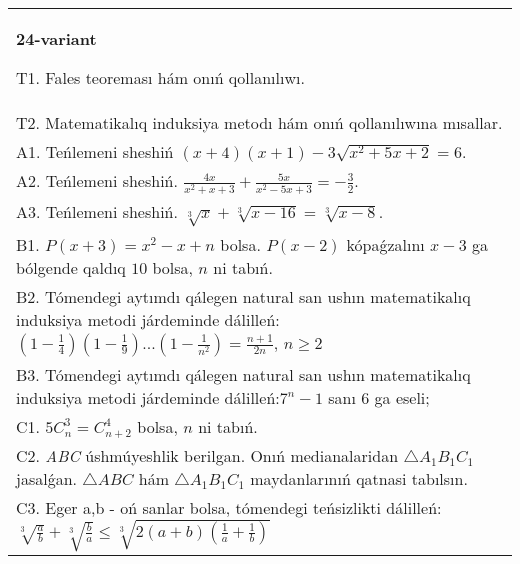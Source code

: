 \documentclass{article}
\begin{document}
\begin{tabular}{m{17cm}}
\textbf{24-variant}
\newline

T1. Fales teoreması hám onıń qollanılıwı. \\
T2. Matematikalıq induksiya metodı hám onıń qollanılıwına mısallar. \\
A1. Teńlemeni sheshiń \((x + 4)(x + 1) - 3\sqrt{x^{2} + 5x + 2} = 6\). \\
A2. Teńlemeni sheshiń. \(\frac{4x}{x^{2} + x + 3} + \frac{5x}{x^{2} - 5x + 3} = - \frac{3}{2}\). \\
A3. Teńlemeni sheshiń. \(\sqrt[3]{x} + \sqrt[3]{x - 16} = \sqrt[3]{x - 8}\). \\
B1. \(P(x + 3) = x^{2} - x + n\) bolsa. \(P(x - 2)\) kópaǵzalını \(x - 3\) ga bólgende qaldıq \(10\) bolsa, \(n\) ni tabıń. \\
B2. Tómendegi aytımdı qálegen natural san ushın matematikalıq induksiya metodi járdeminde dálilleń: \(\left( 1 - \frac{1}{4} \right)\left( 1 - \frac{1}{9} \right)...\left( 1 - \frac{1}{n^{2}} \right) = \frac{n + 1}{2n}\), \(n \geq 2\) \\
B3. Tómendegi aytımdı qálegen natural san ushın matematikalıq induksiya metodi járdeminde dálilleń:\(7^{n} - 1\) sanı 6 ga eseli; \\
C1. \(5C_{n}^{3} = C_{n + 2}^{4}\) bolsa, \(n\) ni tabıń. \\
C2. \emph{ABC} úshmúyeshlik berilgan. Onıń medianalaridan \(\bigtriangleup A_{1}B_{1}C_{1}\) jasalǵan. \(\bigtriangleup ABC\) hám \(\bigtriangleup A_{1}B_{1}C_{1}\) maydanlarınıń qatnasi tabılsın. \\
C3. Eger a,b - oń sanlar bolsa, tómendegi teńsizlikti dálilleń: \(\sqrt[3]{\frac{a}{b}} + \sqrt[3]{\frac{b}{a}} \leq \sqrt[3]{2(a + b)\left( \frac{1}{a} + \frac{1}{b} \right)}\) \\

\end{tabular}
\vspace{1cm}
\end{document}
